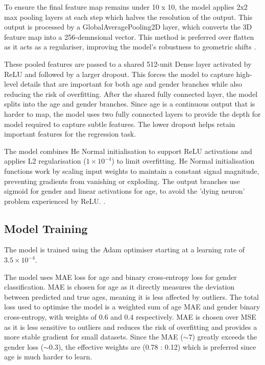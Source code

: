 \documentclass[11pt,a4paper]{article}
\begin{document}
To ensure the final feature map remains under 10 x 10, the model applies 2x2 max pooling layers at each step which halves the resolution of the output. This output is processed by a GlobalAveragePooling2D layer, which converts the 3D feature map into a 256-demnsional vector. This method is preferred over flatten as it acts as a regulariser, improving the model's robustness to geometric shifts \cite{lin2013network}. 

These pooled features are passed to a shared 512-unit Dense layer activated by ReLU and followed by a larger dropout. This forces the model to capture high-level details that are important for both age and gender branches while also reducing the risk of overfitting. After the shared fully connected layer, the model splits into the age and gender branches. Since age is a continuous output that is harder to map, the model uses two fully connected layers to provide the depth for model required to capture subtle features. The lower dropout helps retain important features for the regression task. 

The model combines He Normal initialisation to support ReLU activations and applies L2 regularisation ($1 \times 10^{-4}$) to limit overfitting. He Normal initialisation functions work by scaling input weights to maintain a constant signal magnitude, preventing gradients from vanishing or exploding. The output branches use sigmoid for gender and linear activations for age, to avoid the 'dying neuron' problem experienced by ReLU. \cite{goodfellow2016deep}.

\subsection{Model Training}
The model is trained using the Adam optimiser starting at a learning rate of $3.5 \times10^{-4}$. %

The model uses MAE loss for age and binary cross-entropy loss for gender classification. MAE is chosen for age as it directly measures the deviation between predicted and true ages, meaning it is less affected by outliers. The total loss used to optimise the model is a weighted sum of age MAE and gender binary cross-entropy, with weights of 0.6 and 0.4 respectively. MAE is chosen over MSE as it is less sensitive to outliers and reduces the risk of overfitting and provides a more stable gradient for small datasets. Since the MAE ($\sim 7$) greatly exceeds the gender loss ($\sim 0.3$), the effective weights are (0.78 : 0.12) which is preferred since age is much harder to learn.
\end{document}

